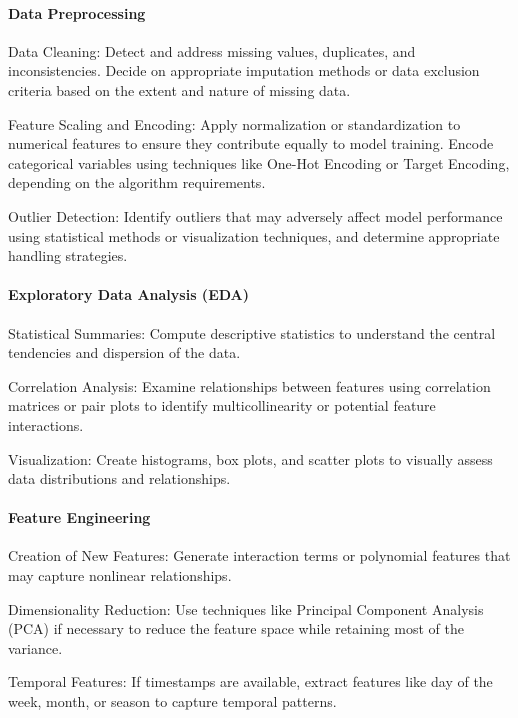 \documentclass[conference]{IEEEtran}
\begin{document}
\paragraph{Data Preprocessing}

\begin{description}
    \item Data Cleaning: Detect and address missing values, duplicates, and inconsistencies. Decide on appropriate imputation methods or data exclusion criteria based on the extent and nature of missing data.
    \item Feature Scaling and Encoding: Apply normalization or standardization to numerical features to ensure they contribute equally to model training. Encode categorical variables using techniques like One-Hot Encoding or Target Encoding, depending on the algorithm requirements.
    \item Outlier Detection: Identify outliers that may adversely affect model performance using statistical methods or visualization techniques, and determine appropriate handling strategies.
\end{description}

\paragraph{Exploratory Data Analysis (EDA)}
\begin{description}
    \item Statistical Summaries: Compute descriptive statistics to understand the central tendencies and dispersion of the data.
    \item Correlation Analysis: Examine relationships between features using correlation matrices or pair plots to identify multicollinearity or potential feature interactions.
    \item Visualization: Create histograms, box plots, and scatter plots to visually assess data distributions and relationships.
\end{description}

\paragraph{Feature Engineering}
\begin{description}
    \item Creation of New Features: Generate interaction terms or polynomial features that may capture nonlinear relationships.
    \item Dimensionality Reduction: Use techniques like Principal Component Analysis (PCA) if necessary to reduce the feature space while retaining most of the variance.
    \item Temporal Features: If timestamps are available, extract features like day of the week, month, or season to capture temporal patterns.
\end{description}
\end{document}
